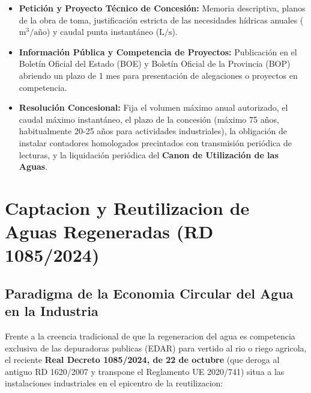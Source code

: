 \documentclass{report}
\begin{document}
\begin{itemize}

    \item \textbf{Petición y Proyecto Técnico de Concesión:} Memoria descriptiva, planos de la obra de toma, justificación estricta de las necesidades hídricas anuales ($\text{m}^3/\text{año}$) y caudal punta instantáneo ($\text{L/s}$).

    \item \textbf{Información Pública y Competencia de Proyectos:} Publicación en el Boletín Oficial del Estado (BOE) y Boletín Oficial de la Provincia (BOP) abriendo un plazo de 1 mes para presentación de alegaciones o proyectos en competencia.

    \item \textbf{Resolución Concesional:} Fija el volumen máximo anual autorizado, el caudal máximo instantáneo, el plazo de la concesión (máximo 75 años, habitualmente 20-25 años para actividades industriales), la obligación de instalar contadores homologados precintados con transmisión periódica de lecturas, y la liquidación periódica del \textbf{Canon de Utilización de las Aguas}.

\end{itemize}




\section{Captacion y Reutilizacion de Aguas Regeneradas (RD 1085/2024)}

\subsection{Paradigma de la Economia Circular del Agua en la Industria}

Frente a la creencia tradicional de que la regeneracion del agua es competencia exclusiva de las depuradoras publicas (EDAR) para vertido al rio o riego agricola, el reciente \textbf{Real Decreto 1085/2024, de 22 de octubre} (que deroga al antiguo RD 1620/2007 y transpone el Reglamento UE 2020/741) situa a las instalaciones industriales en el epicentro de la reutilizacion:
\end{document}
